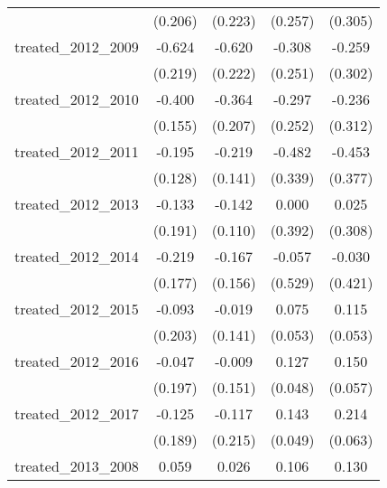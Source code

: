 {\begin{tabular}{l*{4}{c}}
            &     (0.206)         &     (0.223)         &     (0.257)         &     (0.305)         \\
[1em]
treated\_2012\_2009&      -0.624\sym{**} &      -0.620\sym{**} &      -0.308         &      -0.259         \\
            &     (0.219)         &     (0.222)         &     (0.251)         &     (0.302)         \\
[1em]
treated\_2012\_2010&      -0.400\sym{**} &      -0.364         &      -0.297         &      -0.236         \\
            &     (0.155)         &     (0.207)         &     (0.252)         &     (0.312)         \\
[1em]
treated\_2012\_2011&      -0.195         &      -0.219         &      -0.482         &      -0.453         \\
            &     (0.128)         &     (0.141)         &     (0.339)         &     (0.377)         \\
[1em]
treated\_2012\_2013&      -0.133         &      -0.142         &       0.000         &       0.025         \\
            &     (0.191)         &     (0.110)         &     (0.392)         &     (0.308)         \\
[1em]
treated\_2012\_2014&      -0.219         &      -0.167         &      -0.057         &      -0.030         \\
            &     (0.177)         &     (0.156)         &     (0.529)         &     (0.421)         \\
[1em]
treated\_2012\_2015&      -0.093         &      -0.019         &       0.075         &       0.115\sym{*}  \\
            &     (0.203)         &     (0.141)         &     (0.053)         &     (0.053)         \\
[1em]
treated\_2012\_2016&      -0.047         &      -0.009         &       0.127\sym{**} &       0.150\sym{**} \\
            &     (0.197)         &     (0.151)         &     (0.048)         &     (0.057)         \\
[1em]
treated\_2012\_2017&      -0.125         &      -0.117         &       0.143\sym{**} &       0.214\sym{***}\\
            &     (0.189)         &     (0.215)         &     (0.049)         &     (0.063)         \\
[1em]
treated\_2013\_2008&       0.059         &       0.026         &       0.106         &       0.130\sym{**} \\

\end{tabular}}
